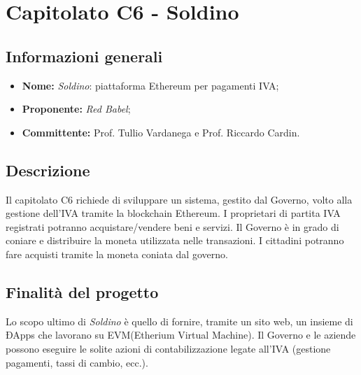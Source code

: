 \documentclass{article}
\begin{document}
	
	
	
	\section{Capitolato C6 - Soldino}
	
	\subsection{Informazioni generali}
	\begin{itemize}
		\item \textbf {Nome:} \textit{Soldino}: piattaforma Ethereum per pagamenti IVA;
		\item \textbf {Proponente:} \textit{Red Babel};
		\item \textbf {Committente:} Prof. Tullio Vardanega e Prof. Riccardo Cardin.
	\end{itemize}
	
	\subsection{Descrizione}
	Il capitolato C6 richiede di sviluppare un sistema, gestito dal Governo, volto alla gestione dell'IVA tramite la blockchain Ethereum. I proprietari di partita IVA registrati potranno acquistare/vendere beni e servizi.
	Il Governo è in grado di coniare e distribuire la moneta utilizzata nelle transazioni. I cittadini potranno fare acquisti tramite la moneta coniata dal governo.   
	
	\subsection{Finalità del progetto}
	Lo scopo ultimo di \textit{Soldino} è quello di fornire, tramite un sito web, un insieme di ÐApps che lavorano su EVM(Etherium Virtual Machine). Il Governo e le aziende possono eseguire le solite azioni di contabilizzazione legate all'IVA (gestione pagamenti, tassi di cambio, ecc.).  
\end{document}
